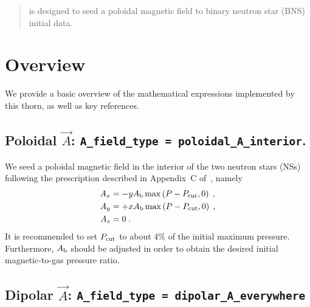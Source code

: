 \linespread{1.0}

\newenvironment{packed_itemize}{
\begin{itemize}
  \setlength{\itemsep}{0.0pt}
  \setlength{\parskip}{0.0pt}
  \setlength{\parsep}{ 0.0pt}
}{\end{itemize}}

\newenvironment{packed_enumerate}{
\begin{enumerate}
  \setlength{\itemsep}{0.0pt}
  \setlength{\parskip}{0.0pt}
  \setlength{\parsep}{ 0.0pt}
}{\end{enumerate}}

\begin{abstract}
  \thornname is designed to seed a poloidal magnetic field to binary
  neutron star (BNS) initial data.
\end{abstract}

\section{Overview}
\label{sec:overview}

We provide a basic overview of the mathematical expressions implemented
by this thorn, as well as key references.

\subsection{Poloidal $\vec{A}$: \texttt{A\_field\_type = poloidal\_A\_interior}.}
\label{sec:poloidal_A_interior}

We seed a poloidal magnetic field in the interior of the two neutron
stars (NSs) following the prescription described in Appendix~C
of~\cite{etienne2015illinoisgrmhd}, namely
\begin{align}
  A_{x} &= -yA_{\rm b}\max\left(P-P_{\rm cut},0\right)\;,\\
  A_{y} &= +xA_{\rm b}\max\left(P-P_{\rm cut},0\right)\;,\\
  A_{z} &= 0\;.
\end{align}
It is recommended to set $P_{\rm cut}$ to about 4\% of the initial
maximum pressure. Furthermore, $A_{\rm b}$ should be adjusted in order
to obtain the desired initial magnetic-to-gas pressure ratio.


\subsection{Dipolar $\vec{A}$: \texttt{A\_field\_type = dipolar\_A\_everywhere}}
\label{sec:dipolar_A_everywhere}

